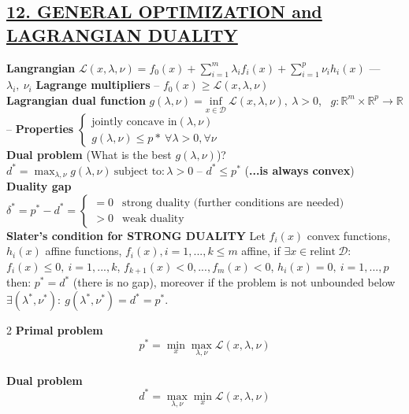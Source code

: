 \documentclass[a4paper]{article}
\begin{document}
\subsection*{\color{cyan}
\textsf{
    \underline{12. GENERAL OPTIMIZATION and LAGRANGIAN DUALITY}}}
\textbf{Langrangian} $\mathcal{L}(x,\lambda, \nu)=f_0(x)+\sum_{i=1}^m{\lambda_i{f_i(x)}}+\sum_{i=1}^p{\nu_i{h_i(x)}}$ --- $\lambda_i, \ \nu_i$ \textbf{Lagrange multipliers} -- $f_0(x)\ge\mathcal{L}(x,\lambda,\nu)$\\
\textbf{Lagrangian dual function} $g(\lambda, \nu) = \underset{x\in\mathcal{D}}{\text{inf}} \ {\mathcal{L}(x, \lambda, \nu)}, \ \lambda>0$, \ $g:\mathbb{R}^m\times\mathbb{R}^p\to\mathbb{R}$ -- \textbf{Properties} $\begin{cases}
    \text{jointly concave in} (\lambda,\nu)\\
    g(\lambda,\nu)\le p* \ \forall \lambda>0, \forall \nu
\end{cases}$\\
\textbf{Dual problem} (What is the best $g(\lambda,\nu)$)? $d^*=\max_{\lambda,\nu} g(\lambda,\nu) \ \text{subject to}: \lambda>0 $ -- $d^*\le{p^*}$ (\textbf{...is always convex})\\
\textbf{Duality gap} $\delta^*=p^*-d^*=\begin{cases}
    =0&\text{strong duality (further conditions are needed)}\\
    >0&\text{weak duality}
\end{cases}$\\
\textbf{Slater's condition for STRONG DUALITY} Let $f_i(x)$ convex functions, $h_i(x)$ affine functions, $f_i(x), i=1,...,k\le{m}$ affine, if $\exists{x}\in\text{relint}\ \mathcal{D}$: $f_i(x)\le0, \ i=1,..., k$, $f_{k+1}(x)<0, ..., f_m(x)<0$, $h_i(x)=0, \ i=1,...,p$ then: $p^*=d^*$ (there is no gap), moreover if the problem is not unbounded below $\exists(\lambda^*,\nu^*): \ g(\lambda^*, \nu^*)=d^*=p^*. $\\
\vspace{-0.8cm}
\begin{multicols}{2}
    \noindent
    \textbf{Primal problem}
    \vspace{-0.2cm}
    \begin{equation*}
        p^*=\min_{x} \max_{\lambda,\nu} \mathcal{L}(x,\lambda,\nu)
    \end{equation*}
    \newcolumn\\
    \textbf{Dual problem}
    \vspace{-0.2cm}
    \begin{equation*}
        d^*=\max_{\lambda,\nu} \min_{x} \mathcal{L}(x,\lambda,\nu)
    \end{equation*}
\end{multicols}
\end{document}
